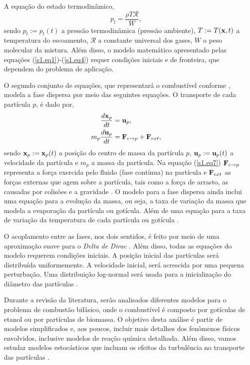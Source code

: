 \documentclass[12pt, brazil]{article}
\begin{document}
A equação do estado termodinâmico,
\begin{equation}
\label{s1.eq4}
p_t=\dfrac{\rho T\mathcal{R}}{W},
\end{equation}
sendo $p_t:=p_t(t)$ a pressão termodinâmica (pressão ambiente), $T:=T({\bf x},t)$ a temperatura do escoamento, $\mathcal{R}$ a constante universal dos gases, $W$ o peso molecular da mistura.  Além disso, o modelo matemático apresentado pelas equações (\ref{s1.eq1})-(\ref{s1.eq4}) requer condições iniciais e de fronteira, que dependem do problema de aplicação.

O segundo conjunto de equações, que representará o combustível conforme \cite{APT09,SAN11,SAN13,SCH11}, modela a fase dispersa por meio das seguintes equações. O transporte de cada partícula $p$, é dado por,
\begin{align}
\label{s1.eq6}
\frac{d \mathbf{x}_p}{d t} & = \mathbf{u}_p,\\
\label{s1.eq7}
m_p\frac{d\mathbf{u}_p}{d t} & = {\bf F}_{c\rightarrow p} + {\bf F}_{ext}, 
\end{align}  
sendo ${\bf x}_p:=\mathbf{x}_p(t)$ a posição do centro de massa da partícula $p$, ${\bf u}_p:=\mathbf{u}_p(t)$ a velocidade da partícula e $m_p$ a massa da partícula. Na equação (\ref{s1.eq7}) ${\bf F}_{c\rightarrow p}$ representa a força exercida pelo fluido (fase contínua) na partícula e ${\bf F}_{ext}$ as forças externas que agem sobre a partícula, tais como a força de arrasto, as causadas por colisões e a gravidade \cite{APT09,CAL12,IRE17,MIN15,RIB09,SCH11}.  O modelo para a fase dispersa ainda inclui uma equação para a evolução da massa, ou seja, a taxa de variação da massa que modela a evaporação da partícula ou gotícula. Além de uma equação para a taxa de variação da temperatura de cada partícula ou gotícula \cite{APT09,SAN13,JIA17,NOH18}.

O acoplamento entre as fases, nos dois sentidos, é feito por meio de uma aproximação suave para o {\it Delta de Dirac} \cite{CAL12,GRI07,MIN15,ROM99}.
Além disso, todas as equações do modelo requerem condições iniciais. A posição inicial das partículas será distribuída uniformemente. A velocidade inicial, será acrescida por uma pequena perturbação. Uma distribuição log-normal será usada para a inicialização do diâmetro das partículas \cite{CAL12,RIB09}.   

Durante a revisão da literatura, serão analisados diferentes modelos para o problema de combustão bifásico, onde o combustível é composto por gotículas de etanol ou por partículas de biomassa. O objetivo desta análise é partir de modelos simplificados e, aos poucos, incluir mais detalhes dos fenômenos físicos envolvidos, inclusive modelos de reação química detalhada. Além disso, vamos estudar modelos estocásticos que incluam os efeitos da turbulência no transporte das partículas \cite{MIN15,POP01}.
\end{document}
